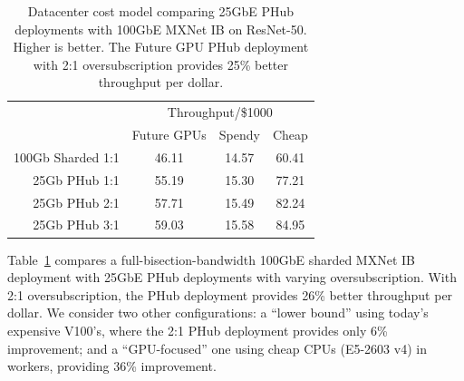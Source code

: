 \begin{table}[tb!]
  \centering
  \begin{tabular}{|r|c|c|c|}
    \hline
    & \multicolumn{3}{c|}{Throughput/\$1000} \\
    
                                 & Future GPUs & Spendy & Cheap \\
    \hline
    100Gb Sharded 1:1 &             46.11 &          14.57 &      60.41\\
    \hline 
    25Gb PHub     1:1 &             55.19 &          15.30 &      77.21\\
    \hline 
    25Gb PHub     2:1 &             57.71 &          15.49 &      82.24\\
    \hline 
    25Gb PHub     3:1 &             59.03 &          15.58 &      84.95\\
    \hline
  \end{tabular}
  \caption{Datacenter cost model comparing 25GbE PHub deployments with 100GbE MXNet IB on ResNet-50. Higher is better. The Future GPU PHub deployment with 2:1 oversubscription provides 25\% better throughput per dollar.}
  \label{table:costModel}
\end{table}


Table~\ref{table:costModel} compares a full-bisection-bandwidth 100GbE sharded MXNet IB deployment with 25GbE PHub deployments with varying oversubscription. With 2:1 oversubscription, the PHub deployment provides 26\% better throughput per dollar. We consider two other configurations: a ``lower bound'' using today's expensive V100's, where the 2:1 PHub deployment provides only 6\% improvement; and a ``GPU-focused'' one using cheap CPUs (E5-2603 v4) in workers, providing 36\% improvement.





